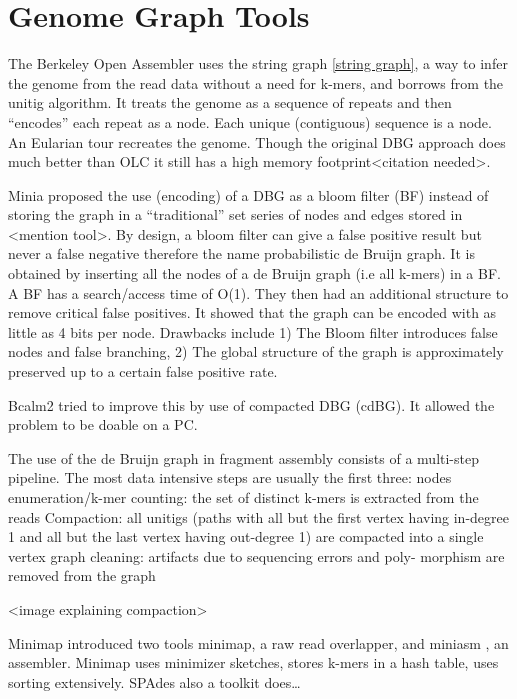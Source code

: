 \documentclass[11pt]{article}
\begin{document}
\section{Genome Graph Tools}
\label{sec:orgc7cb93d}
The Berkeley Open Assembler \cite{myersFragmentAssemblyString2005} uses the 
string graph \ref{string graph}, a way to infer the genome from the read data 
without a need for k-mers, and borrows from the unitig algorithm.
It treats the genome as a sequence of repeats and then “encodes” each repeat as 
a node. Each unique (contiguous) sequence is a node. An Eularian tour recreates
the genome.
Though the original DBG approach does much better than OLC it still has a high 
memory footprint<citation needed>.

Minia \cite{chikhiSpaceefficientExactBruijn2013} proposed the use (encoding) of a 
DBG as a bloom filter (BF) instead of storing the graph in a “traditional” set
series of nodes and edges stored in <mention tool>. 
By design, a bloom filter can give a false positive result but never a false
negative therefore the name probabilistic de Bruijn graph. It is obtained by 
inserting all the nodes of a de Bruijn graph (i.e all k-mers) in a BF. 
A BF has a search/access time of O(1). They then had an additional structure to 
remove critical false positives. It showed that the graph can be encoded with 
as little as 4 bits per node.
Drawbacks include 1) The Bloom filter introduces false nodes and false
branching, 2) The global structure of the graph is approximately preserved up to
a certain false positive rate.

Bcalm2 \cite{chikhiCompactingBruijnGraphs2016} tried to improve this by use of 
compacted DBG (cdBG). It allowed the problem to be doable on a PC.


The use of the de Bruijn graph in fragment assembly consists of a multi-step 
pipeline.
The most data intensive steps are usually the first three: 
nodes enumeration/k-mer counting: the set of distinct k-mers is extracted from 
the reads 
Compaction: all unitigs (paths with all but the first vertex having in-degree 1
and all but the last vertex having out-degree 1) are compacted into a single 
vertex
graph cleaning: artifacts due to sequencing errors and poly- morphism are 
removed from the graph

<image explaining compaction>

Minimap \cite{liMinimapMiniasmFast2016} introduced two tools minimap, a raw read 
overlapper, and miniasm \cite{liMinimapMiniasmFast2016}, an assembler. 
Minimap uses minimizer sketches, stores k-mers in a hash table, uses sorting 
extensively.
SPAdes  also a toolkit does…
\end{document}
